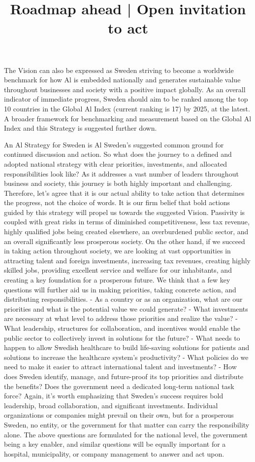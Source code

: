 The Vision can also be expressed as Sweden striving to become a worldwide benchmark for how \(\mathrm{Al}\) is embedded nationally and generates sustainable value throughout businesses and society with a positive impact globally.
As an overall indicator of immediate progress, Sweden should aim to be ranked among the top 10 countries in the Global Al Index (current ranking is 17) by 2025, at the latest.
A broader framework for benchmarking and measurement based on the Global Al Index and this Strategy is suggested further down.

\title{
Roadmap ahead | Open invitation to act
}
An Al Strategy for Sweden is Al Sweden's suggested common ground for continued discussion and action. So what does the journey to a defined and adopted national strategy with clear priorities, investments, and allocated responsibilities look like?
As it addresses a vast number of leaders throughout business and society, this journey is both highly important and challenging.
Therefore, let's agree that it is our actual ability to take action that determines the progress, not the choice of words. It is our firm belief that bold actions guided by this strategy will propel us towards the suggested Vision.
Passivity is coupled with great risks in terms of diminished competitiveness, less tax revenue, highly qualified jobs being created elsewhere, an overburdened public sector, and an overall significantly less prosperous society.
On the other hand, if we succeed in taking action throughout society, we are looking at vast opportunities in attracting talent and foreign investments, increasing tax revenues, creating highly skilled jobs, providing excellent service and welfare for our inhabitants, and creating a key foundation for a prosperous future.
We think that a few key questions will further aid us in making priorities, taking concrete action, and distributing responsibilities.
- As a country or as an organization, what are our priorities and what is the potential value we could generate?
- What investments are necessary at what level to address those priorities and realize the value?
- What leadership, structures for collaboration, and incentives would enable the public sector to collectively invest in solutions for the future?
- What needs to happen to allow Swedish healthcare to build life-saving solutions for patients and solutions to increase the healthcare system's productivity?
- What policies do we need to make it easier to attract international talent and investments?
- How does Sweden identify, manage, and future-proof its top priorities and distribute the benefits? Does the government need a dedicated long-term national task force?
Again, it's worth emphasizing that Sweden's success requires bold leadership, broad collaboration, and significant investments. Individual organizations or companies might prevail on their own, but for a prosperous Sweden, no entity, or the government for that matter can carry the responsibility alone.
The above questions are formulated for the national level, the government being a key enabler, and similar questions will be equally important for a hospital, municipality, or company management to answer and act upon.

